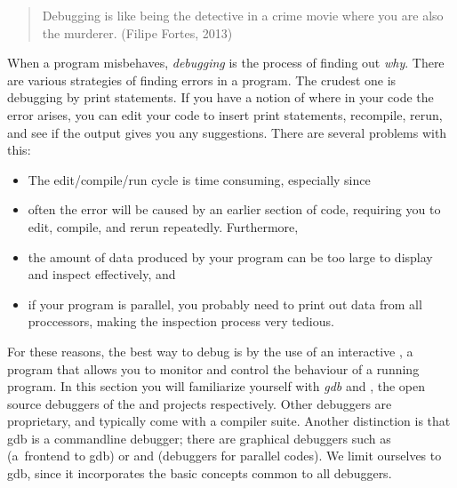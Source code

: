 

\begin{quotation}
  Debugging is like being the detective in a crime movie where you are
  also the murderer. (Filipe Fortes, 2013)
\end{quotation}

When a program misbehaves, \emph{debugging} is the process of finding
out \emph{why}.
There are various strategies of finding errors in a program.
The crudest one is debugging by print statements. If you have a
notion of where in your code the error arises, you can edit your code
to insert print statements, recompile, rerun, and see if the output
gives you any suggestions. There are several problems with this:
\begin{itemize}
\item The edit/compile/run cycle is time consuming, especially since
\item often the error will be caused by an earlier section of code,
  requiring you to edit, compile, and rerun repeatedly. Furthermore,
\item the amount of data produced by your program can be too large to
  display and inspect effectively, and
\item if your program is parallel, you probably need to print out data
  from all proccessors, making the inspection process very tedious.
\end{itemize}


For these reasons, the best way to debug is by the use of an
interactive , a program that allows you to monitor
and control the behaviour of a running program. In this section you
will familiarize yourself with
\emph{gdb} and
,
the open source
debuggers of the  and  projects respectively.
Other debuggers are
proprietary, and typically come with a compiler suite. Another
distinction is that gdb is a commandline debugger; there are
graphical debuggers such as  (a~frontend to gdb) or
 and  (debuggers for parallel
codes). We limit ourselves to gdb, since it incorporates the basic
concepts common to all debuggers.

